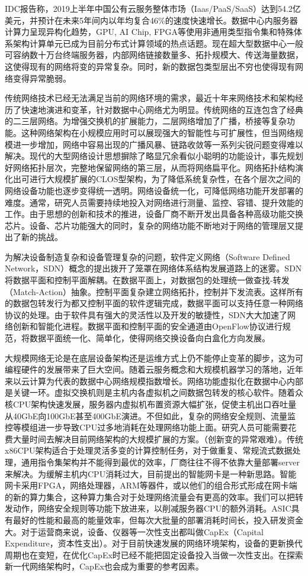 IDC报告称，2019上半年中国公有云服务整体市场（Iaas/PaaS/SaaS）达到54.2亿美元，并预计在未来5年间内以年均复合46\%的速度快速增长。数据中心内服务器计算力呈现异构化趋势，GPU, AI Chip, FPGA等使用非通用类型指令集和特殊体系架构计算单元已成为目前分布式计算领域的热点话题。现在超大型数据中心一般可容纳数十万台终端服务器，内部网络链接数量多、拓扑规模大、传送海量数据，这使得现有的网络将变的异常复杂。同时，新的数据包类型层出不穷也使得现有网络变得异常脆弱。

传统网络技术已经无法满足当前的网络环境的需求，最近十年来网络技术和架构经历了快速地演进和变革，针对数据中心网络尤为明显。传统网络的互连包含了经典的二三层网络。为增强交换机的扩展能力，二层网络增加了广播，桥接等复杂功能。这种网络架构在小规模应用时可以展现强大的智能性与可扩展性，但当网络规模进一步增加，网络中容易出现的广播风暴、链路收敛等一系列尖锐问题变得难以解决。现代的大型网络设计思想摒除了略显冗余看似小聪明的功能设计，事先规划好网络拓扑层次，完整地保留网络的第三层，从而将网络扁平化。网络拓扑结构演化出可进行大规模扩展的CLOS型架构，为了降低系统复杂性，在各个层次之间的网络设备功能也逐步变得统一透明。网络设备统一化，可降低网络功能开发部署的难度。通常，研究人员需要持续地投入对网络进行测量、监控、容错、提升效能的工作。由于思想的创新和技术的推进，设备厂商不断开发出具备各种高级功能交换芯片。设备、芯片功能强大的同时，复杂的网络功能不断地对于网络的管理层又提出了新的挑战。

为解决设备制造复杂和设备管理复杂的问题，软件定义网络（Software Defined Network，SDN）概念的提出拨开了笼罩在网络体系结构发展道路上的迷雾。SDN将数据平面和控制平面解耦。在数据平面上，对数据包的处理统一做查找-转发（Match-Action）抽象。控制平面复杂建立网络拓扑，控制并下发流表。这样所有的数据包转发行为都又控制平面的软件逻辑完成，数据平面可以支持任意一种网络协议的处理。由于软件具有强大的灵活性以及开发的敏捷性，SDN大大加速了网络创新和智能化进程。数据平面和控制平面的安全通道由OpenFlow协议进行规范，将数据平面统一化、简单化，使得网络交换设备向白盒化方向发展。	

大规模网络无论是在底层设备架构还是运维方式上仍不能停止变革的脚步，这为可编程硬件的发展带来了巨大空间。随着云服务概念和大规模机器学习的落地，近年来以云计算为代表的数据中心网络规模指数增长。网络功能虚拟化在数据中心内部是关键一环。虚拟交换机则是主机内各虚拟机之间数据包转发的核心软件。随着众核CPU架构快速发展，服务器内虚拟机布置资源大幅扩张，促使主机出口吞吐量从40GbE向100GbE甚至400GbE演进。不但如此，复杂的网络安全规则、流量监控等模组进一步导致CPU过多地消耗在处理网络功能上面。研究人员可能需要花费大量时间去解决目前网络架构的大规模扩展的方案。（创新变的异常艰难）。传统x86CPU架构适合于处理灵活多变的计算控制任务，对于做重复、常规流式数据处理，通用指令集架构并不能得到最优的效率，厂商往往不得不依靠大量部署server来解决。为缓解主机内CPU消耗过大，目前提出的智能网卡是一种新思路。智能网卡采用FPGA，网络处理器，ARM等器件，或以他们的组合形式形成在网卡端的新的算力集合，这种算力集合对于处理网络流量会有更高的效率。我们可以把转发动作，网络安全规则等功能下放进来，以削减服务器CPU的额外消耗。ASIC具有最好的性能和最高的能量效率，但每次大批量的部署消耗时间长，投入研发资金大。对于运营商来说，设备、仪器等一次性支出都叫做CapEx（Capital Expenditure，资本性支出）。对于目前快速发展的网络环境架构，设备的更新换代周期也在变短，在优化CapEx时已经不能把固定设备投入当做一次性支出。在探索新一代网络架构时，CapEx也会成为重要的参考因素。

